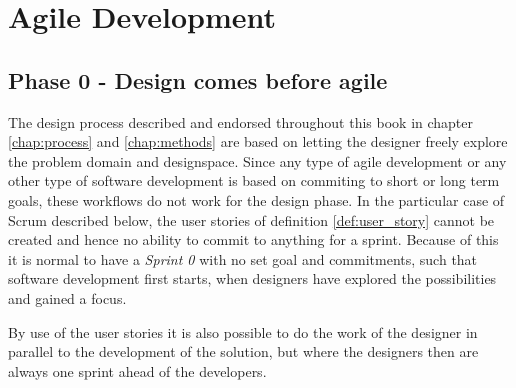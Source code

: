 \section{Agile Development} \label{sec:agile_development}


\begin{concept} \label{conc:agile} 
  
\end{concept}

\begin{definition} \label{def:user_story} 
  
\end{definition}

\begin{definition} \label{def:product_owner} 

\end{definition}

\begin{definition} \label{def:product_backlog} 

\end{definition}

\subsection{Phase 0 - Design comes before agile} \label{sec:design_before_agile}
The design process described and endorsed throughout this book in chapter \ref{chap:process} and \ref{chap:methods} are based on letting the designer freely explore the problem domain and designspace. Since any type of agile development or any other type of software development is based on commiting to short or long term goals, these workflows do not work for the design phase. In the particular case of Scrum described below, the user stories of definition \ref{def:user_story} cannot be created and hence no ability to commit to anything for a sprint. Because of this it is normal to have a \emph{Sprint 0} with no set goal and commitments, such that software development first starts, when designers have explored the possibilities and gained a focus. \cite[p. 27]{beyer}

By use of the user stories it is also possible to do the work of the designer in parallel to the development of the solution, but where the designers then are always one sprint ahead of the developers. \cite[p. 13]{beyer}

